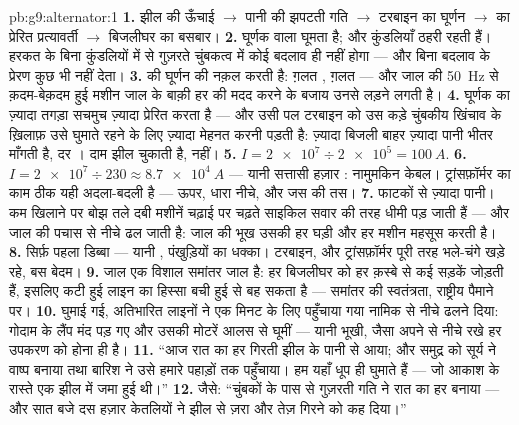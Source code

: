 \begin{solution}{pb:g9:alternator:1}
\textbf{1.} झील की ऊँचाई $\to$ पानी की झपटती गति $\to$ टरबाइन का
घूर्णन $\to$  का प्रेरित प्रत्यावर्ती  $\to$
बिजलीघर का बसबार।
\textbf{2.} घूर्णक वाला  घूमता है; और कुंडलियाँ ठहरी रहती हैं।
हरकत के बिना कुंडलियों में से गुज़रते चुंबकत्व में कोई बदलाव ही नहीं
होगा --- और बिना बदलाव के प्रेरण कुछ भी नहीं देता।
\textbf{3.}  की  घूर्णन की नक़ल करती है: ग़लत ,
ग़लत  --- और जाल की \qty{50}{Hz} से क़दम-बेक़दम हुई मशीन जाल के
बाक़ी हर  की मदद करने के बजाय उनसे लड़ने लगती है।
\textbf{4.} घूर्णक का ज़्यादा तगड़ा  सचमुच ज़्यादा प्रेरित करता
है --- और उसी पल टरबाइन को उस कड़े चुंबकीय खिंचाव के ख़िलाफ़ उसे
घुमाते रहने के लिए ज़्यादा मेहनत करनी पड़ती है: ज़्यादा बिजली बाहर
ज़्यादा पानी भीतर माँगती है,  दर । दाम झील चुकाती है, 
नहीं।
\textbf{5.} $I = \num{2e7} \div \num{2e5} = \qty{100}{A}$.
\textbf{6.} $I = \num{2e7} \div 230 \approx \qty{8.7e4}{A}$ ---
यानी सत्तासी हज़ार : नामुमकिन केबल। ट्रांसफ़ॉर्मर का काम ठीक
यही अदला-बदली है ---  ऊपर, धारा नीचे, और  जस की तस।
\textbf{7.} फाटकों से ज़्यादा पानी। कम खिलाने पर बोझ तले दबी मशीनें
चढ़ाई पर चढ़ते साइकिल सवार की तरह धीमी पड़ जाती हैं --- और जाल की
 पचास से नीचे ढल जाती है: जाल की भूख उसकी हर घड़ी और हर मशीन
महसूस करती है।
\textbf{8.} सिर्फ़ पहला डिब्बा --- यानी , पंखुड़ियों का धक्का।
टरबाइन,  और ट्रांसफ़ॉर्मर पूरी तरह भले-चंगे खड़े रहे,
बस बेदम।
\textbf{9.} जाल एक विशाल समांतर जाल है: हर बिजलीघर को हर क़स्बे से कई
सड़कें जोड़ती हैं, इसलिए कटी हुई लाइन का हिस्सा बची हुई  से बह
सकता है --- समांतर की स्वतंत्रता, राष्ट्रीय पैमाने पर।
\textbf{10.} घुमाई गई, अतिभारित लाइनों ने एक मिनट के लिए पहुँचाया गया
 नामिक से नीचे ढलने दिया: गोदाम के लैंप मंद पड़ गए और उसकी
मोटरें आलस से घूमीं --- यानी भूखी, जैसा अपने  से नीचे
रखे हर उपकरण को होना ही है।
\textbf{11.} ``आज रात का हर  गिरती झील के पानी से आया; और समुद्र को
सूर्य ने वाष्प बनाया तथा बारिश ने उसे हमारे पहाड़ों तक पहुँचाया। हम
यहाँ धूप ही घुमाते हैं --- जो आकाश के रास्ते एक झील में जमा हुई थी।''
\textbf{12.} जैसे: ``चुंबकों के पास से गुज़रती गति ने रात का हर 
बनाया --- और सात बजे दस हज़ार केतलियों ने झील से ज़रा और तेज़ गिरने
को कह दिया।''
\end{solution}
